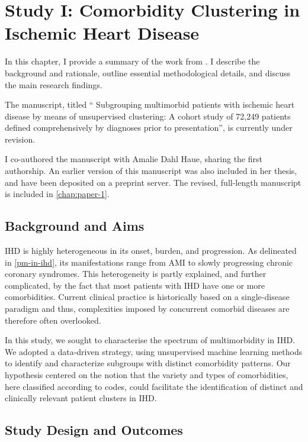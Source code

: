 \chapter{Study I: Comorbidity Clustering in Ischemic Heart Disease}
\label{outline-study-1}

In this chapter, I provide a summary of the work from \studyi{}.
I describe the background and rationale,
outline essential methodological details,
and discuss the main research findings.

The manuscript, titled \enquote{%
Subgrouping multimorbid patients with ischemic heart disease by
means of unsupervised clustering: A cohort study of 72,249
patients defined comprehensively by diagnoses prior to
presentation}, is currently under revision.

I co-authored the manuscript with Amalie Dahl Haue,
sharing the first authorship.
An earlier version of this manuscript was also included in 
her thesis, and have been deposited on a preprint server. 
\autocite{haueSubgrouping2023}
The revised, full-length manuscript is included in 
\cref{chap:paper-1}.

\section{Background and Aims}

\Ac{IHD} is highly heterogeneous in its onset, burden, and progression.
As delineated in \cref{pm-in-ihd}, its manifestations range from 
\ac{AMI} to slowly progressing chronic coronary syndromes.
This heterogeneity is partly explained, and further complicated,
by the fact that most patients with \ac{IHD} have one or more 
comorbidities.
Current clinical practice is historically based on a single-disease paradigm
and thus, complexities imposed by concurrent comorbid diseases are therefore 
often overlooked.
~\autocite{formanMultimorbidity2018}

In this study, we sought to characterise the spectrum of multimorbidity
in \ac{IHD}. 
We adopted a data-driven strategy, using unsupervised machine learning
methods to identify and characterize subgroups 
with distinct comorbidity patterns. 
Our hypothesis centered on the notion that the 
variety and types of comorbidities,
here classified according to  codes, 
could facilitate the identification of distinct and clinically relevant 
patient clusters in \ac{IHD}.

\section{Study Design and Outcomes}

